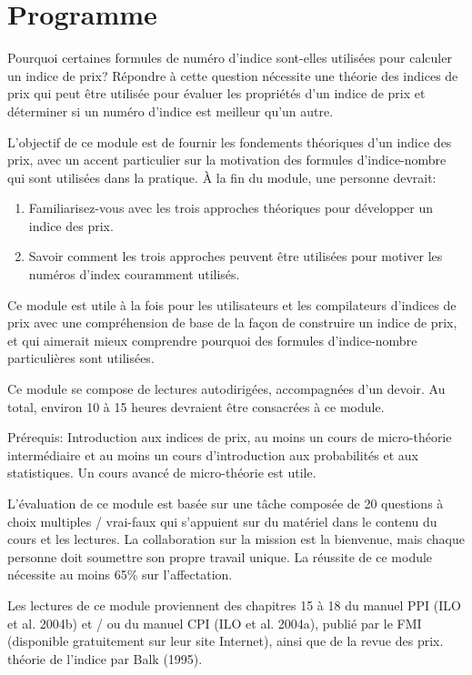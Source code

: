 \documentclass[]{article}
\begin{document}
\hypertarget{programme-1}{%
\section{Programme}\label{programme-1}}

Pourquoi certaines formules de numéro d'indice sont-elles utilisées pour calculer un indice de prix? Répondre à cette question nécessite une théorie des indices de prix qui peut être utilisée pour évaluer les propriétés d'un indice de prix et déterminer si un numéro d'indice est meilleur qu'un autre.

L'objectif de ce module est de fournir les fondements théoriques d'un indice des prix, avec un accent particulier sur la motivation des formules d'indice-nombre qui sont utilisées dans la pratique. À la fin du module, une personne devrait:

\begin{enumerate}
\def\labelenumi{\arabic{enumi}.}
\item
  Familiarisez-vous avec les trois approches théoriques pour développer un indice des prix.
\item
  Savoir comment les trois approches peuvent être utilisées pour motiver les numéros d'index couramment utilisés.
\end{enumerate}

Ce module est utile à la fois pour les utilisateurs et les compilateurs d'indices de prix avec une compréhension de base de la façon de construire un indice de prix, et qui aimerait mieux comprendre pourquoi des formules d'indice-nombre particulières sont utilisées.

Ce module se compose de lectures autodirigées, accompagnées d'un devoir. Au total, environ 10 à 15 heures devraient être consacrées à ce module.

Prérequis: Introduction aux indices de prix, au moins un cours de micro-théorie intermédiaire et au moins un cours d'introduction aux probabilités et aux statistiques. Un cours avancé de micro-théorie est utile.

L'évaluation de ce module est basée sur une tâche composée de 20 questions à choix multiples / vrai-faux qui s'appuient sur du matériel dans le contenu du cours et les lectures. La collaboration sur la mission est la bienvenue, mais chaque personne doit soumettre son propre travail unique. La réussite de ce module nécessite au moins 65\% sur l'affectation.

Les lectures de ce module proviennent des chapitres 15 à 18 du manuel PPI (ILO et al. 2004b) et / ou du manuel CPI (ILO et al. 2004a), publié par le FMI (disponible gratuitement sur leur site Internet), ainsi que de la revue des prix. théorie de l'indice par Balk (1995).
\end{document}

